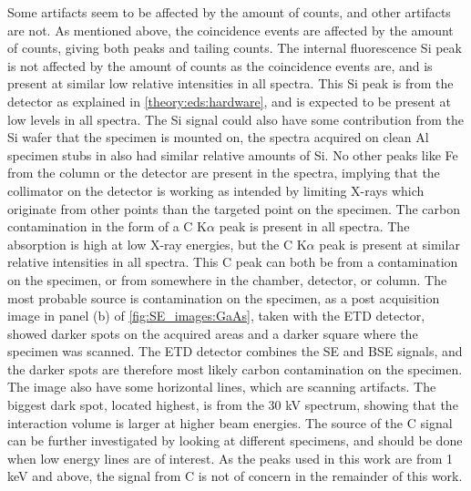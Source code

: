Some artifacts seem to be affected by the amount of counts, and other artifacts are not.
As mentioned above, the coincidence events are affected by the amount of counts, giving both peaks and tailing counts.
The internal fluorescence Si peak is not affected by the amount of counts as the coincidence events are, and is present at similar low relative intensities in all spectra.
This Si peak is from the detector as explained in \cref{theory:eds:hardware}, and is expected to be present at low levels in all spectra.
The Si signal could also have some contribution from the Si wafer that the specimen is mounted on, the spectra acquired on clean Al specimen stubs in \cite{project_report} also had similar relative amounts of Si.
No other peaks like Fe from the column or the detector are present in the spectra, implying that the collimator on the detector is working as intended by limiting X-rays which originate from other points than the targeted point on the specimen.
The carbon contamination in the form of a C K$\alpha$ peak is present in all spectra.
The absorption is high at low X-ray energies, but the C K$\alpha$ peak is present at similar relative intensities in all spectra.
This C peak can both be from a contamination on the specimen, or from somewhere in the chamber, detector, or column.
The most probable source is contamination on the specimen, as a post acquisition image in panel (b) of \cref{fig:SE_images:GaAs}, taken with the ETD detector, showed darker spots on the acquired areas and a darker square where the specimen was scanned.
The ETD detector combines the SE and BSE signals, and the darker spots are therefore most likely carbon contamination on the specimen.
The image also have some horizontal lines, which are scanning artifacts.
The biggest dark spot, located highest, is from the 30 kV spectrum, showing that the interaction volume is larger at higher beam energies.
The source of the C signal can be further investigated by looking at different specimens, and should be done when low energy lines are of interest.
As the peaks used in this work are from 1 keV and above, the signal from C is not of concern in the remainder of this work.


